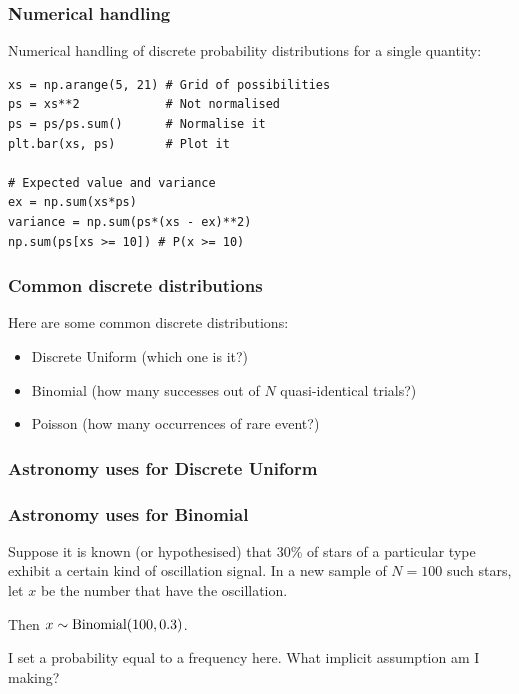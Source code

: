 \documentclass{beamer}
\begin{document}
\begin{frame}[t, fragile]
\frametitle{Numerical handling}
Numerical handling of discrete probability distributions for a single
quantity: \vspace{2em}

\begin{verbatim}
xs = np.arange(5, 21) # Grid of possibilities
ps = xs**2            # Not normalised
ps = ps/ps.sum()      # Normalise it
plt.bar(xs, ps)       # Plot it

# Expected value and variance
ex = np.sum(xs*ps) 
variance = np.sum(ps*(xs - ex)**2)
np.sum(ps[xs >= 10]) # P(x >= 10)
\end{verbatim}


\end{frame}




\begin{frame}[t, fragile]
\frametitle{Common discrete distributions}

Here are some common discrete distributions:

\begin{itemize}
\item <2-> Discrete Uniform (which one is it?)
\item <3-> Binomial (how many successes out of $N$ quasi-identical trials?)
\item <4-> Poisson (how many occurrences of rare event?)
\end{itemize}

\end{frame}


\begin{frame}[t, fragile]
\frametitle{Astronomy uses for Discrete Uniform}



\end{frame}


\begin{frame}[t, fragile]
\frametitle{Astronomy uses for Binomial}

Suppose it is known (or hypothesised) that 30\% of stars of a particular type
exhibit a certain kind of oscillation signal. In a new sample of $N=100$
such stars, let $x$ be the number that have the oscillation.\vspace{1em}

Then $x \sim \textnormal{Binomial}(100, 0.3)$.

\vspace{2em}
{\tiny I set a probability equal to a frequency here. What implicit
 assumption am I making?}
\end{frame}
\end{document}
